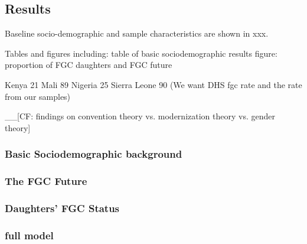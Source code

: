 \documentclass[12pt,]{article}
\begin{document}
\subsection{Results}\label{results-1}

Baseline socio-demographic and sample characteristics are shown in xxx.

Tables and figures including:
table of basic sociodemographic results
figure:  proportion of FGC daughters and FGC future

Kenya 21%
Mali 89%
Nigeria 25%
Sierra Leone 90%
(We want DHS fgc rate and the rate from our samples)

\_\_{[}CF: findings on convention theory vs. modernization theory vs. gender theory{]}

\subsubsection{Basic Sociodemographic background}\label{Basic-Sociodemographic-background}

\subsubsection{The FGC Future}\label{The-FGC-Future}

\subsubsection{Daughters' FGC Status}\label{Daughters'-FGC-Status}

\subsubsection{full model}\label{full-model}
\end{document}
